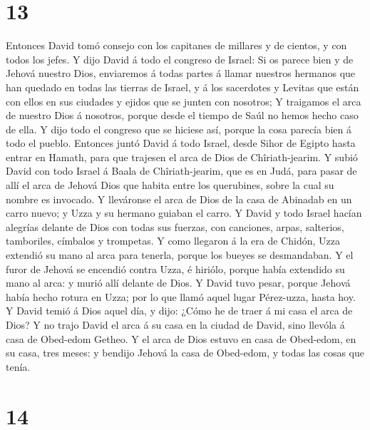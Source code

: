 \hypertarget{section-12}{%
\section{13}\label{section-12}}

 Entonces David tomó consejo con los capitanes de millares
y de cientos, y con todos los jefes.  Y dijo David á todo
el congreso de Israel: Si os parece bien y de Jehová nuestro Dios,
enviaremos á todas partes á llamar nuestros hermanos que han quedado en
todas las tierras de Israel, y á los sacerdotes y Levitas que están con
ellos en sus ciudades y ejidos que se junten con nosotros;
 Y traigamos el arca de nuestro Dios á nosotros, porque
desde el tiempo de Saúl no hemos hecho caso de ella.  Y
dijo todo el congreso que se hiciese así, porque la cosa parecía bien á
todo el pueblo.  Entonces juntó David á todo Israel, desde
Sihor de Egipto hasta entrar en Hamath, para que trajesen el arca de
Dios de Chîriath-jearim.  Y subió David con todo Israel á
Baala de Chîriath-jearim, que es en Judá, para pasar de allí el arca de
Jehová Dios que habita entre los querubines, sobre la cual su nombre es
invocado.  Y lleváronse el arca de Dios de la casa de
Abinadab en un carro nuevo; y Uzza y su hermano guiaban el carro.
 Y David y todo Israel hacían alegrías delante de Dios con
todas sus fuerzas, con canciones, arpas, salterios, tamboriles, címbalos
y trompetas.  Y como llegaron á la era de Chidón, Uzza
extendió su mano al arca para tenerla, porque los bueyes se desmandaban.
 Y el furor de Jehová se encendió contra Uzza, é hiriólo,
porque había extendido su mano al arca: y murió allí delante de Dios.
 Y David tuvo pesar, porque Jehová había hecho rotura en
Uzza; por lo que llamó aquel lugar Pérez-uzza, hasta hoy.
 Y David temió á Dios aquel día, y dijo: ¿Cómo he de
traer á mi casa el arca de Dios?  Y no trajo David el
arca á su casa en la ciudad de David, sino llevóla á casa de Obed-edom
Getheo.  Y el arca de Dios estuvo en casa de Obed-edom,
en su casa, tres meses: y bendijo Jehová la casa de Obed-edom, y todas
las cosas que tenía.

\hypertarget{section-13}{%
\section{14}\label{section-13}}

